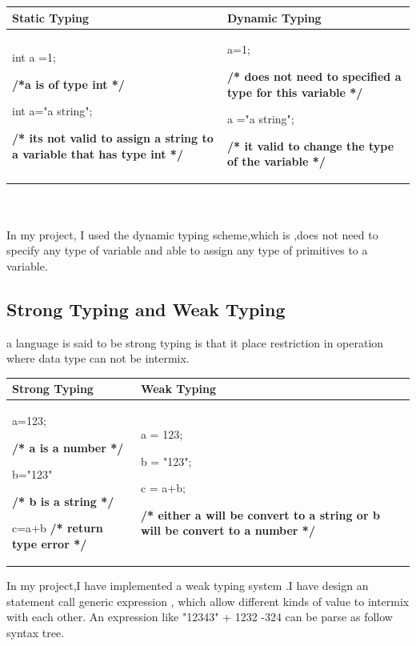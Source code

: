 \begin{tabular}{p{5cm}|p{5cm}}
\hline
Static Typing & Dynamic Typing \\
\hline
int a =1;\par \textbf{/*a is of type int */} \par int a="a string"; \par \textbf{ /* its not valid to assign a string to a variable that has type int */} & a=1; \par \textbf{/* does not need to specified a type for this variable */} \par a ="a string"; \par
\textbf{/* it valid to change the type of the variable */} \\ 
\hline
\end{tabular} \\\\
In my project, I used the dynamic typing scheme,which is ,does not need to specify any type of variable and able to assign any type of primitives to a variable.

\subsection{Strong Typing and Weak Typing}
a language is said to be strong typing is that it place restriction in operation where data type can not be intermix.


\begin{tabular}{p{6cm}|p{6cm}}
\hline Strong Typing & Weak Typing  \\ 
\hline a=123; \par 
\textbf{/* a is a number */} \par 
b="123" \par  
\textbf{/* b is a string */} \par 
c=a+b \textbf{/* return type error */}  &  
a = 123; \par 
b = "123"; \par
c = a+b; \par 
\textbf{/* either a will be convert to a string or b will be convert to a number */}

\\ 
\hline 
\end{tabular} 

In my project,I have implemented a weak typing system .I have design an statement call generic expression , which allow different kinds of value to intermix with each other. An expression like "12343" + 1232 -324 can be parse as follow syntax tree.




